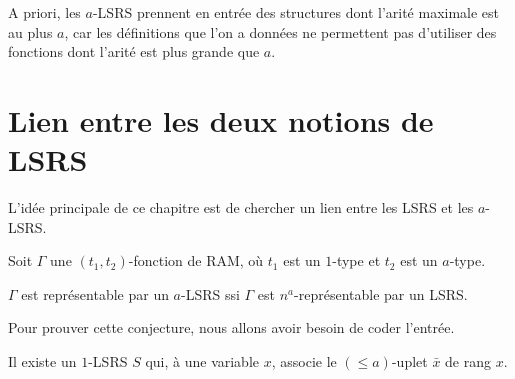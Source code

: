 \documentclass{report}
\newcommand{\leqa}{\left( \leqslant a \right)}
\begin{document}
		A priori, les $a$-LSRS prennent en entrée des structures dont l'arité maximale est au plus $a$, car les définitions que l'on a données ne permettent pas d'utiliser des fonctions dont l'arité est plus grande que $a$. 
		
		
		
		
		
	
		
	\section{Lien entre les deux notions de LSRS}
	\label{sec:lien_LSRS_aLSRS}
	
	L'idée principale de ce chapitre est de chercher un lien entre les LSRS et les $a$-LSRS.
	
	\begin{conj}
		Soit $\Gamma$ une $(t_1,t_2)$-fonction de RAM, où $t_1$ est un $1$-type et $t_2$ est un $a$-type.
		
		$\Gamma$ est représentable par un $a$-LSRS ssi $\Gamma$ est $n^a$-représentable par un LSRS.
	\end{conj}
		
	Pour prouver cette conjecture, nous allons avoir besoin de coder l'entrée.
	
	\begin{lemma}
		\label{lem:decomp_rang_par_LSRS}
		
		Il existe un $1$-LSRS $S$ qui, à une variable $x$, associe le $\leqa$-uplet $\bar{x}$ de rang $x$. 
	\end{lemma}
		
\end{document}
